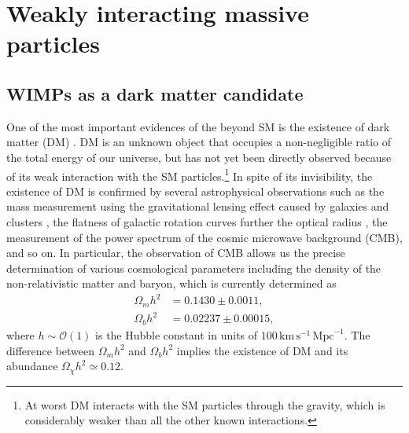 \documentclass[12pt,twoside,book]{article}
\begin{document}
\section[Weakly interacting massive particles]{Weakly interacting
 massive particles}
\setcounter{equation}{0}

\vskip 0.1in

\subsection[WIMPs as a dark matter candidate]{WIMPs as a dark matter candidate}

One of the most important evidences of the beyond SM is the existence of
dark matter (DM) \cite{Zwicky:1933}.  DM is an unknown object that
occupies a non-negligible ratio of the total energy of our universe, but
has not yet been directly observed because of its weak interaction with
the SM particles.\footnote{
At worst DM interacts with the SM particles through the gravity, which
is considerably weaker than all the other known interactions.
}
In spite of its invisibility, the existence of DM is confirmed by
several astrophysical observations such as the mass measurement using
the gravitational lensing effect caused by galaxies and clusters
\cite{Zwicky:1937, Trimble:1987ee}, the flatness of galactic rotation
curves further the optical radius \cite{1939LicOB..19...41B,
Begeman:1991iy}, the measurement of the power spectrum of the cosmic
microwave background (CMB), and so on.  In particular, the observation
of CMB allows us the precise determination of various cosmological
parameters \cite{Jungman:1995av, Jungman:1995bz} including the density
of the non-relativistic matter and baryon, which is currently
determined as \cite{Aghanim:2018eyx}
\begin{align}
 \Omega_m h^2 &= 0.1430 \pm 0.0011,\\
 \Omega_b h^2 &= 0.02237 \pm 0.00015,
\end{align}
where $h \sim \mathcal{O}(1)$ is the Hubble constant in units of
$100\, \mathrm{km}\, \mathrm{s}^{-1}\, \mathrm{Mpc}^{-1}$.  The
difference between $\Omega_m h^2$ and $\Omega_b h^2$ implies the
existence of DM and its abundance $\Omega_\chi h^2 \simeq 0.12$.
\end{document}
